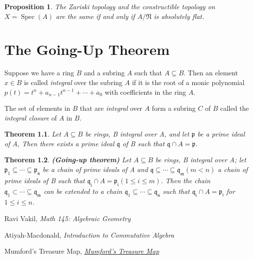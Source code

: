 \documentclass[]{report}
\newtheorem{theorem}{Theorem}[section]
\newtheorem{prop}[theorem]{Proposition}
\DeclareMathOperator\Spec{Spec}
\newcommand\mfk[1]{\mathfrak{#1}}
\begin{document}
\begin{prop}
    The Zariski topology and the constructible topology on $X = \Spec(A)$ are the same if and only if $A/\mfk{N}$ is \textit{absolutely flat}.
\end{prop}


\chapter{The Going-Up Theorem}

Suppose we have a ring $B$ and a subring $A$ such that $A \subseteq B$. Then an element $x \in B$ is called \textit{integral} over the subring $A$ if it is the root of a monic polynomial $p(t) = t^n + a_{n-1}t^{n-1} + \cdots + a_0$ with coefficients in the ring $A$.

The set of elements in $B$ that are \textit{integral} over $A$ form a subring $C$ of $B$ called the \textit{integral closure} of $A$ in $B$.

\begin{theorem}
    Let $A\subseteq B$ be rings, B integral over A, and let $\mathfrak{p}$ be a prime ideal of A, Then there exists a prime ideal $\mathfrak{q}$ of B such that $\mathfrak{q}\cap A = \mathfrak{p}$. 
\end{theorem}

\begin{theorem}
    \textbf{(Going-up theorem)} Let $A \subseteq B$ be rings, B integral over A; let $\mathfrak{p_1 \subseteq \cdots \subseteq p_n}$ be a chain of prime ideals of A and $\mathfrak{q \subseteq \cdots \subseteq q_m} (m < n )$ a chain of prime ideals of B such that $\mathfrak{q_i} \cap A = \mathfrak{p_i} (1 \leq i \leq m)$. Then the chain $\mathfrak{q_1 \subset \cdots \subseteq q_m}$ can be extended to a chain $\mathfrak{q_1 \subseteq \cdots \subseteq q_n}$ such that $\mathfrak{q_i} \cap A = \mathfrak{p_i}$ for $1 \leq i \leq n$.
\end{theorem}

\begin{thebibliography}{9}

    Ravi Vakil,
    \textit{Math 145: Algebraic Geometry}

    Atiyah-Macdonald, 
    \textit{Introduction to Commutative Algebra}

    Mumford's Treasure Map,
    \href{https://web.archive.org/web/20201130150255/http://www.neverendingbooks.org/mumfords-treasure-map}{\textit{Mumford's Treasure Map}}
\end{thebibliography}
\end{document}
